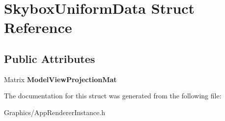 \hypertarget{structSkyboxUniformData}{}\section{Skybox\+Uniform\+Data Struct Reference}
\label{structSkyboxUniformData}
\subsection*{Public Attributes}
\begin{DoxyCompactItemize}
\item 
\mbox{\label{structSkyboxUniformData_a123d9e69d28dcafbcd79cc5f9e4b336a}} 
Matrix {\bfseries Model\+View\+Projection\+Mat}
\end{DoxyCompactItemize}


The documentation for this struct was generated from the following file\+:\begin{DoxyCompactItemize}
\item 
Graphics/App\+Renderer\+Instance.\+h\end{DoxyCompactItemize}
